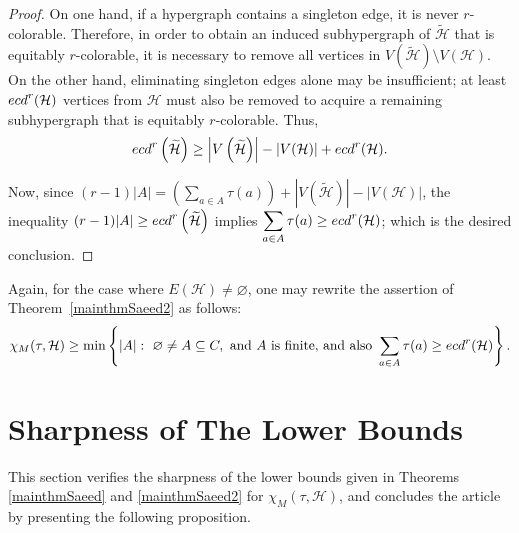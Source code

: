 \documentclass[11pt]{amsart}
\theoremstyle{definition}
\begin{document}
\begin{proof}
{		\noindent
		On one hand, if a hypergraph contains a singleton edge, it is never $r$-colorable. Therefore, in order to obtain an induced subhypergraph of $\widetilde{\mathcal{H}}$ that is equitably $r$-colorable, it is necessary to remove all vertices in $V(\widetilde{\mathcal{H}}) \setminus V(\mathcal{H})$. On the other hand, eliminating singleton edges alone
		may be insufficient; at least ${\rm ecd}^r(\mathcal{H})$ vertices from $\mathcal{H}$ must also be removed to acquire a remaining subhypergraph that is equitably $r$-colorable.
		Thus, 
		$${\rm ecd}^r\left(\widetilde{{\mathcal H}}\right) \geq \left|V\left(\widetilde{{\mathcal H}}\right)\right|-|V({\mathcal H})|+{\rm ecd}^r({\mathcal H}).$$
		
		Now, since 
		$(r-1)|A| = \left( \displaystyle\sum_{a\in A}\tau(a) \right) + \left|V\left(\widetilde{{\mathcal H}}\right)\right|-|V({\mathcal H})|$,
		the inequality
		$(r-1)|A| \geq {\rm ecd}^r\left(\widetilde{{\mathcal H}}\right)$
		implies
		$\displaystyle\sum_{a\in A}\tau(a) \geq  {\rm ecd}^r({\mathcal H})$;
		which is the desired conclusion.
	}
\end{proof}

Again, for the case where $E({\mathcal{H}}) \neq \varnothing$, one may rewrite the assertion of Theorem~\ref{mainthmSaeed2}
as follows:
$$\chi_M(\tau,{\mathcal H})\geq \min\left\{|A|:\   \varnothing \neq A \subseteq C, \mbox{ and } A \mbox{ is finite,}  \mbox{ and also } \sum_{a\in A}\tau(a) \geq  {\rm ecd}^r({\mathcal H})\right\}.$$


\maketitle
\section{{\bf Sharpness of The Lower Bounds}}

This section verifies the sharpness of the lower bounds given in Theorems \ref{mainthmSaeed} and \ref{mainthmSaeed2} for $\chi_M(\tau,{\mathcal H})$, and concludes the article by presenting the following proposition.
\end{document}
